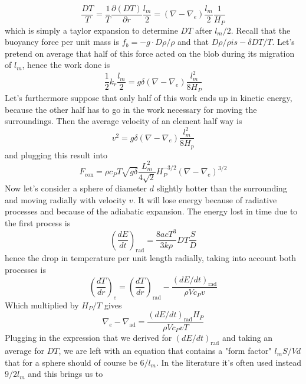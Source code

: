 \begin{equation}
	\frac{DT}{T}=\frac{1}{T}\frac{\partial (DT)}{\partial r} \frac{l_m}{2}=(\nabla-\nabla_e)\frac{l_m}{2}\frac{1}{H_P}
\end{equation}
which is simply a taylor expansion to determine $DT$ after $l_m/2$. Recall that the buoyancy force per unit mass is $f_b=-g \cdot D \rho / \rho$ and that $D \rho / \rho is - \delta D T / T$. Let's pretend on average that half of this force acted on the blob during its migration of $l_m$, hence the work done is
\begin{equation}\label{7.6}
	\frac{1}{2} k_r \frac{l_m}{2}=g \delta (\nabla - \nabla_e)\frac{l_m^2}{8 H_P}
\end{equation}
Let's furthermore suppose that only half of this work ends up in kinetic energy, because the other half has to go in the work necessary for moving the surroundings. Then the average velocity of an element half way is
\begin{equation}
	v^2=g \delta (\nabla - \nabla_e)\frac{l_m^2}{8 H_p}
\end{equation}
and plugging this result into \label{fconv}
\begin{equation}
F_{\mathrm{con}}= \rho c_P T \sqrt{g \delta} \frac{L^2_m}{4\sqrt{2}}H_P^{-3/2} (\nabla-\nabla_e)^{3/2}
\end{equation}
Now let's consider a sphere of diameter $d$ slightly hotter than the surrounding and moving radially with velocity $v$. It will lose energy because of radiative processes and because of the adiabatic expansion. The energy lost in time due to the first process is
\begin{equation}
\left (\frac{d E}{d t}  \right )_{\mathrm{rad}} = \frac{8 a c T^3}{3 k \rho} DT \frac{S}{D}
\end{equation}
hence the drop in temperature per unit length radially, taking into account both processes is
\begin{equation}\label{7.7}
	\left (  \frac{d T}{d r }   \right )_e = \left(  \frac{dT}{d r }   \right )_{\mathrm{rad}} - \frac{\left( d E / dt \right)_{\mathrm{rad}} }{\rho V c_P v}
\end{equation}
Which multiplied by $H_P/T$ gives
\begin{equation}
\nabla_e - \nabla_{\mathrm{ad}} =  \frac{\left( dE/dt \right)_{ \mathrm{rad} } H_P}{\rho V c_P v T}
\end{equation}
Plugging in the expression that we derived for $(dE/dt)_{\mathrm{rad}}$ and taking an average for $DT$, we are left with an equation that contains a "form factor" $l_m S/Vd$ that for a sphere should of course be $6/l_m$. In the literature it's often used instead $9/2l_m$ and this brings us to
